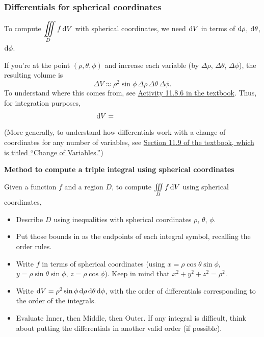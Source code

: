 \subsubsection{Differentials for spherical coordinates}
To compute $\displaystyle\iiint\limits_D f\mathop{}\!\mathrm{d} V$ with spherical coordinates, we need $\mathop{}\!\mathrm{d} V$ in terms of $\mathop{}\!\mathrm{d} \rho$, $\mathop{}\!\mathrm{d} \theta$, $\mathop{}\!\mathrm{d} \phi$.

If you're at the point $(\rho,\theta,\phi)$ and increase each variable (by $\Delta \rho$, $\Delta \theta$, $\Delta \phi$), the resulting volume is 
\[
    \Delta V \approx \rho^2 \sin\phi \, \Delta \rho\, \Delta \theta \, \Delta \phi.
\]
To understand where this comes from, see \href{https://activecalculus.org/vector/S-11-8-Triple-Integrals-Cylindrical-Spherical.html#A_11_8_8}{Activity 11.8.6 in the textbook}. Thus, for integration purposes, 
\[
    \dV = \phantom{\rho^2\sin\phi \, \drho \dtheta \dphi.}
\]
\bigskip 

(More generally, to understand how differentials work with a change of coordinates for any number of variables, see \href{https://activecalculus.org/vector/S-11-9-Change-of-Variable.html}{Section 11.9 of the textbook, which is titled ``Change of Variables.''})
\begin{framed}
    {\centering 
        \textbf{Method to compute a triple integral using spherical coordinates}  
    \par}
    \bigskip 
    
    Given a function $f$ and a region $D$, to compute $\iiint\limits_D f\mathop{}\!\mathrm{d} V$ using spherical coordinates,
    \begin{itemize}
        \item Describe $D$ using inequalities with spherical coordinates $\rho$, $\theta$, $\phi$.
        \item Put those bounds in as the endpoints of each integral symbol, recalling the order rules.
        \item Write $f$ in terms of spherical coordinates (using $x=\rho\cos\theta\sin\phi$, $y=\rho\sin\theta\sin\phi$, $z=\rho\cos\phi$). Keep in mind that $x^2+y^2+z^2=\rho^2$.
        \item Write $\mathop{}\!\mathrm{d} V = \rho^2\sin\phi\mathop{}\!\mathrm{d} \rho\mathop{}\!\mathrm{d} \theta\mathop{}\!\mathrm{d} \phi$, with the order of differentials corresponding to the order of the integrals.
        \item Evaluate Inner, then Middle, then Outer. If any integral is difficult, think about putting the differentials in another valid order (if possible).
    \end{itemize} 
\end{framed}

